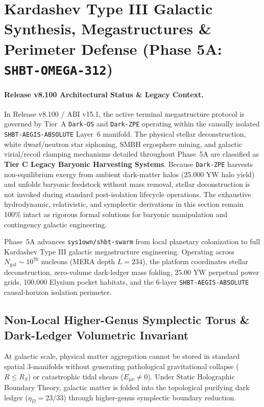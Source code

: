 \documentclass[11pt,onecolumn]{article}
\begin{document}
\FloatBarrier


\section{Kardashev Type III Galactic Synthesis, Megastructures \& Perimeter Defense (Phase 5A: \texttt{SHBT-OMEGA-312})}
\paragraph{Release v8.100 Architectural Status \& Legacy Context.}
In Release v8.100 / ABI v15.1, the active terminal megastructure protocol is governed by Tier~A \texttt{Dark-OS} and \texttt{Dark-ZPE} operating within the causally isolated \texttt{SHBT-AEGIS-ABSOLUTE} Layer~6 manifold. The physical stellar deconstruction, white dwarf/neutron star siphoning, SMBH ergosphere mining, and galactic virial/recoil clamping mechanisms detailed throughout Phase~5A are classified as \textbf{Tier C Legacy Baryonic Harvesting Systems}. Because \texttt{Dark-ZPE} harvests non-equilibrium exergy from ambient dark-matter halos ($25.000\text{ YW}$ halo yield) and unfolds baryonic feedstock without mass removal, stellar deconstruction is not invoked during standard post-isolation lifecycle operations. The exhaustive hydrodynamic, relativistic, and symplectic derivations in this section remain 100\% intact as rigorous formal solutions for baryonic manipulation and contingency galactic engineering.

\label{sec:omega_megastructures}

Phase~5A advances \texttt{sys1own/shbt-swarm} from local planetary colonization to full Kardashev Type III galactic megastructure engineering. Operating across $N_{\text{gal}} \sim 10^{70}$ nucleons (MERA depth $L = 234$), the platform coordinates stellar deconstruction, zero-volume dark-ledger mass folding, $25.00\text{ YW}$ perpetual power grids, 100,000 Elysium pocket habitats, and the 6-layer \texttt{SHBT-AEGIS-ABSOLUTE} causal-horizon isolation perimeter.

\subsection{Non-Local Higher-Genus Symplectic Torus \& Dark-Ledger Volumetric Invariant}
\label{sec:omega_symplectic_torus}

At galactic scale, physical matter aggregation cannot be stored in standard spatial 3-manifolds without generating pathological gravitational collapse ($R \le R_S$) or catastrophic tidal shears ($E_{\mu\nu} \neq 0$). Under Static Holographic Boundary Theory, galactic matter is folded into the topological purifying dark ledger ($\eta_D = 23/33$) through higher-genus symplectic boundary reduction.
\end{document}
